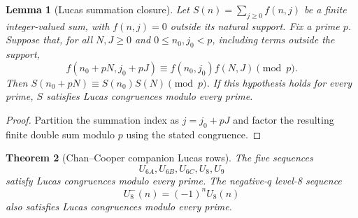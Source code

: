 \documentclass[11pt,a4paper]{article}
\newtheorem{theorem}{Theorem}[section]
\newtheorem{lemma}[theorem]{Lemma}
\begin{document}
\begin{lemma}[Lucas summation closure]
\label{lem:lucas-summation-closure}
Let $S(n)=\sum_{j\ge0} f(n,j)$ be a finite integer-valued sum, with $f(n,j)=0$
outside its natural support.  Fix a prime $p$.  Suppose that, for all
$N,J\ge0$ and $0\le n_0,j_0<p$, including terms outside the support,
\[
 f(n_0+pN,j_0+pJ)\equiv f(n_0,j_0)f(N,J)\pmod p.
\]
Then $S(n_0+pN)\equiv S(n_0)S(N)\pmod p$.  If this hypothesis holds
for every prime, $S$ satisfies Lucas congruences modulo every prime.
\end{lemma}
\begin{proof}
Partition the summation index as $j=j_0+pJ$ and factor the resulting
finite double sum modulo $p$ using the stated congruence.
\end{proof}

\begin{theorem}[Chan--Cooper companion Lucas rows]
\label{thm:chan-cooper-companion-lucas}
The five sequences
\[
  U_{6A},U_{6B},U_{6C},U_8,U_9
\]
satisfy Lucas congruences modulo every prime.  The negative-$q$ level-8
sequence
\[
  U_8^-(n)=(-1)^nU_8(n)
\]
also satisfies Lucas congruences modulo every prime.
\end{theorem}
\end{document}
